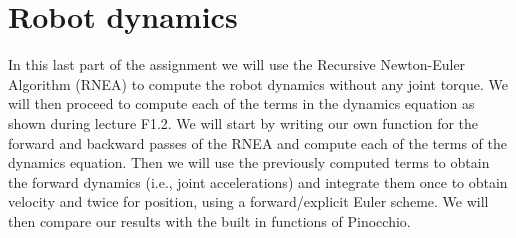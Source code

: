 \documentclass[11pt]{article}
\begin{document}
\section{Robot dynamics}

In this last part of the assignment we will use the Recursive Newton-Euler Algorithm (RNEA) to compute the robot dynamics without any joint torque. We will then proceed to compute each of the terms in the dynamics equation as shown during lecture F1.2. We will start by writing our own function for the forward and backward passes of the RNEA and compute each of the terms of the dynamics equation. Then we will use the previously computed terms to obtain the forward dynamics (i.e., joint accelerations) and integrate them once to obtain velocity and twice  for position, using a forward/explicit Euler scheme. We will then compare our results with the built in functions of Pinocchio.
\end{document}
